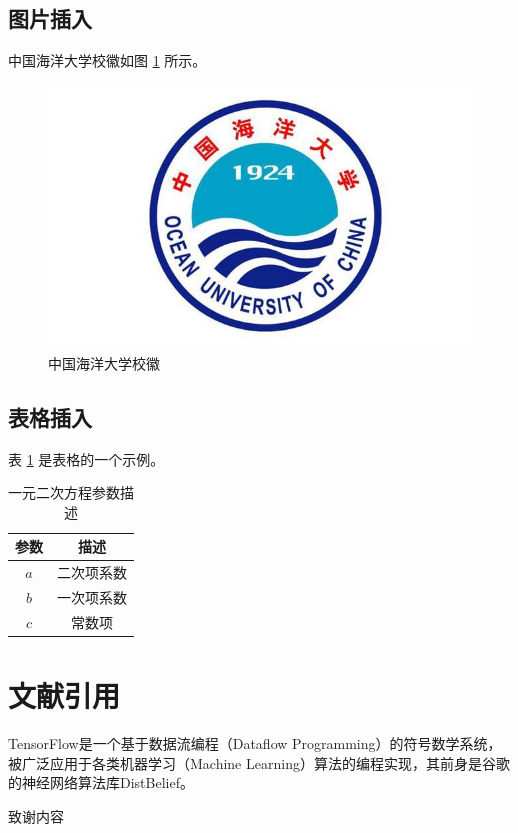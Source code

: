 \documentclass[
    Print       = false,
    Title       = 中国海洋大学硕博学位论文LaTeX模板,
    Author      = 作者,
    Advisor     = 指导教师,
    Thesis      = 全日制专业学位,
    Major       = 专业名称,
    Topic       = 研究方向,
    Year        = 2021,
    Month       = 5,
    Day         = 12,
    TitleEng    = {{LaTeX Template for Master's and Doctoral Dissertations of Ocean University of China}}
]{oucthesis}
\begin{document}
    \section{图片插入}

    中国海洋大学校徽如图 \ref{fig:ouc} 所示。

    \begin{figure}[ht]
        \centering
        \includegraphics[width=.5\textwidth]{img/ouc.jpg}
        \caption{中国海洋大学校徽}
        \label{fig:ouc}
    \end{figure}

    \section{表格插入}

    表 \ref{tab:} 是表格的一个示例。

    \begin{table}[h]
        \centering
        \caption{一元二次方程参数描述}
        \begin{tabular}{cc}
            \toprule
            参数&描述\\
            \midrule
            $a$&二次项系数\\
            $b$&一次项系数\\
            $c$&常数项\\
            \bottomrule
        \end{tabular}
        \label{tab:}
    \end{table}

    \chapter{文献引用}

    TensorFlow\cite{abadi2016tensorflow}是一个基于数据流编程（Dataflow Programming）的符号数学系统，被广泛应用于各类机器学习（Machine Learning）算法的编程实现，其前身是谷歌的神经网络算法库DistBelief。

    
    \begin{acknowledgement}
        致谢内容
    \end{acknowledgement}
\end{document}
